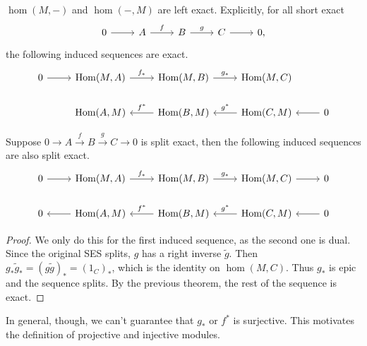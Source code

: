 \documentclass[twoside,10pt]{report}
\begin{document}
\begin{thrm}[]
	$\hom(M,-)$ and $\hom(-,M)$ are left exact. Explicitly, for all short exact
\[
        \begin{tikzcd}
                0 \rar & A \rar{f} & B\rar{g} & C \rar & 0,
        \end{tikzcd}
\] the following induced sequences are exact.
\[
\begin{tikzcd}
        0 \rar & \hom(M,A) \rar{f_{*}} & \hom(M,B) \rar{g_{*}} & \hom(M,C) \\
               & \hom(A,M) & \hom(B,M)\lar["f^{*}"'] & \hom(C,M)\lar["g^{*}"'] & 0\lar
\end{tikzcd}
\]
\end{thrm}

\begin{cor}[]
	Suppose $0 \to A \stackrel{f}{\to } B \stackrel{g}{\to } C\to 0$ is split exact, then the following induced sequences are also split exact.
	\[
	\begin{tikzcd}
		0 \rar & \hom(M,A) \rar{f_{*}} & \hom(M,B) \rar{g_{*}} & \hom(M,C)\rar & 0 \\
		0 & \hom(A,M)\lar & \hom(B,M)\lar["f^{*}"'] & \hom(C,M)\lar["g^{*}"'] & 0\lar
	\end{tikzcd}
	\]
\end{cor}
\begin{proof}
	We only do this for the first induced sequence, as the second one is dual. Since the original SES splits, $g$ has a right inverse $\tilde{g}$. Then $g_{*}\tilde{g}_{*} = (g\tilde{g})_{*} = (1_{C})_{*}$, which is the identity on $\hom(M,C)$. Thus $g_{*}$ is epic and the sequence splits. By the previous theorem, the rest of the sequence is exact.
\end{proof}

\begin{note}[]
In general, though, we can't guarantee that $g_{*}$ or $f^{*}$ is surjective. This motivates the definition of projective and injective modules.
\end{note}
\end{document}

